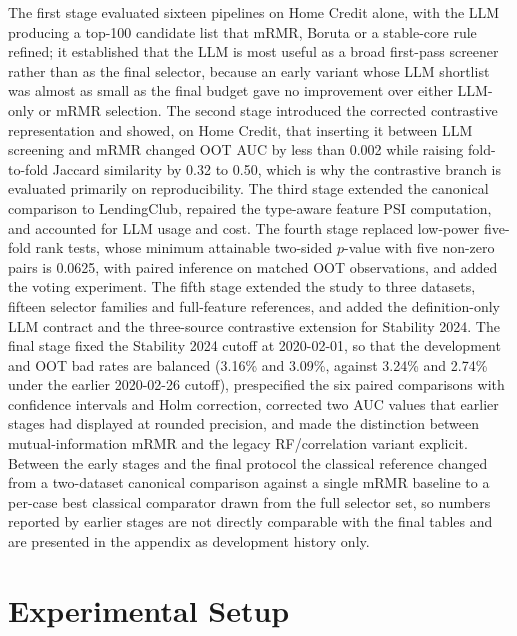 \documentclass[preprint,12pt]{elsarticle}
\begin{document}
The first stage evaluated sixteen pipelines on Home Credit alone, with the LLM producing a top-100 candidate list that mRMR, Boruta or a stable-core rule refined; it established that the LLM is most useful as a broad first-pass screener rather than as the final selector, because an early variant whose LLM shortlist was almost as small as the final budget gave no improvement over either LLM-only or mRMR selection. The second stage introduced the corrected contrastive representation and showed, on Home Credit, that inserting it between LLM screening and mRMR changed OOT AUC by less than 0.002 while raising fold-to-fold Jaccard similarity by 0.32 to 0.50, which is why the contrastive branch is evaluated primarily on reproducibility. The third stage extended the canonical comparison to LendingClub, repaired the type-aware feature PSI computation, and accounted for LLM usage and cost. The fourth stage replaced low-power five-fold rank tests, whose minimum attainable two-sided $p$-value with five non-zero pairs is 0.0625, with paired inference on matched OOT observations, and added the voting experiment. The fifth stage extended the study to three datasets, fifteen selector families and full-feature references, and added the definition-only LLM contract and the three-source contrastive extension for Stability 2024. The final stage fixed the Stability 2024 cutoff at 2020-02-01, so that the development and OOT bad rates are balanced (3.16\% and 3.09\%, against 3.24\% and 2.74\% under the earlier 2020-02-26 cutoff), prespecified the six paired comparisons with confidence intervals and Holm correction, corrected two AUC values that earlier stages had displayed at rounded precision, and made the distinction between mutual-information mRMR and the legacy RF/correlation variant explicit. Between the early stages and the final protocol the classical reference changed from a two-dataset canonical comparison against a single mRMR baseline to a per-case best classical comparator drawn from the full selector set, so numbers reported by earlier stages are not directly comparable with the final tables and are presented in the appendix as development history only.


\section{Experimental Setup}
\label{sec:experimental_setup}
\end{document}
